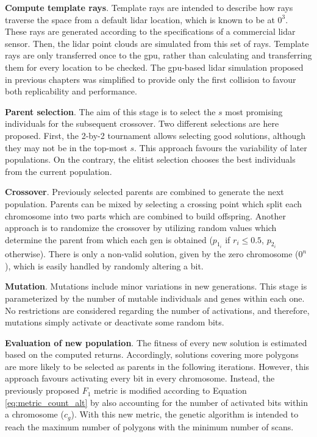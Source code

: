 \textbf{Compute template rays}. Template rays are intended to describe how rays traverse the space from a default \acrshort{lidar} location, which is known to be at $0^3$. These rays are generated according to the specifications of a commercial \acrshort{lidar} sensor. Then, the \acrshort{lidar} point clouds are simulated from this set of rays. Template rays are only transferred once to the \acrshort{gpu}, rather than calculating and transferring them for every location to be checked. The \acrshort{gpu}-based \acrshort{lidar} simulation proposed in previous chapters was simplified to provide only the first collision to favour both replicability and performance. 

\textbf{Parent selection}. The aim of this stage is to select the $s$ most promising individuals for the subsequent crossover. Two different selections are here proposed. First, the 2-by-2 tournament allows selecting good solutions, although they may not be in the top-most $s$. This approach favours the variability of later populations. On the contrary, the elitist selection chooses the best individuals from the current population.

\textbf{Crossover}. Previously selected parents are combined to generate the next population. Parents can be mixed by selecting a crossing point which split each chromosome into two parts which are combined to build offspring. Another approach is to randomize the crossover by utilizing random values which determine the parent from which each gen is obtained ($p_{1_{i}}$ if $r_i \leq 0.5$, $p_{2_{i}}$ otherwise). There is only a non-valid solution, given by the zero chromosome ($0^n$), which is easily handled by randomly altering a bit.

\textbf{Mutation}. Mutations include minor variations in new generations. This stage is parameterized by the number of mutable individuals and genes within each one. No restrictions are considered regarding the number of activations, and therefore, mutations simply activate or deactivate some random bits.

\textbf{Evaluation of new population}. The fitness of every new solution is estimated based on the computed returns. Accordingly, solutions covering more polygons are more likely to be selected as parents in the following iterations. However, this approach favours activating every bit in every chromosome. Instead, the previously proposed $F_1$ metric is modified according to Equation \ref{eq:metric_count_alt} by also accounting for the number of activated bits within a chromosome ($c_g$). With this new metric, the genetic algorithm is intended to reach the maximum number of polygons with the minimum number of scans.


